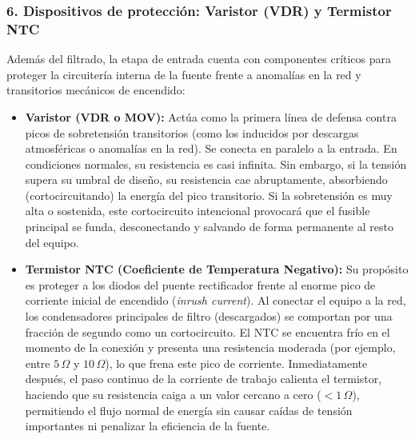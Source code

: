 \documentclass[12pt, a4paper]{article}
\begin{document}
\subsubsection*{6. Dispositivos de protección: Varistor (VDR) y Termistor NTC}
Además del filtrado, la etapa de entrada cuenta con componentes críticos para proteger la circuitería interna de la fuente frente a anomalías en la red y transitorios mecánicos de encendido:
\begin{itemize}
    \item \textbf{Varistor (VDR o MOV):} Actúa como la primera línea de defensa contra picos de sobretensión transitorios (como los inducidos por descargas atmosféricas o anomalías en la red). Se conecta en paralelo a la entrada. En condiciones normales, su resistencia es casi infinita. Sin embargo, si la tensión supera su umbral de diseño, su resistencia cae abruptamente, absorbiendo (cortocircuitando) la energía del pico transitorio. Si la sobretensión es muy alta o sostenida, este cortocircuito intencional provocará que el fusible principal se funda, desconectando y salvando de forma permanente al resto del equipo.
    \item \textbf{Termistor NTC (Coeficiente de Temperatura Negativo):} Su propósito es proteger a los diodos del puente rectificador frente al enorme pico de corriente inicial de encendido (\textit{inrush current}). Al conectar el equipo a la red, los condensadores principales de filtro (descargados) se comportan por una fracción de segundo como un cortocircuito. El NTC se encuentra frío en el momento de la conexión y presenta una resistencia moderada (por ejemplo, entre $5\,\Omega$ y $10\,\Omega$), lo que frena este pico de corriente. Inmediatamente después, el paso continuo de la corriente de trabajo calienta el termistor, haciendo que su resistencia caiga a un valor cercano a cero ($<1\,\Omega$), permitiendo el flujo normal de energía sin causar caídas de tensión importantes ni penalizar la eficiencia de la fuente.
\end{itemize}
\end{document}
